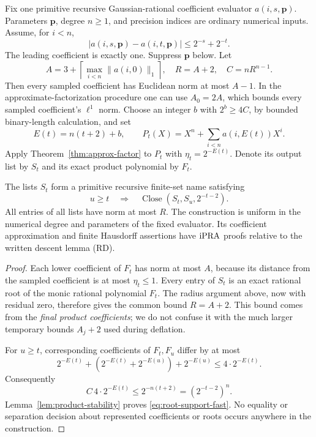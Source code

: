 Fix one primitive recursive Gaussian-rational coefficient evaluator
\(a(i,s,\mathbf p)\). Parameters \(\mathbf p\), degree \(n\ge1\), and
precision indices are ordinary numerical inputs. Assume, for \(i<n\),
\[
 |a(i,s,\mathbf p)-a(i,t,\mathbf p)|\le2^{-s}+2^{-t}.
 \tag{CN}\label{eq:coefficient-name-root}
\]
The leading coefficient is exactly one. Suppress \(\mathbf p\) below.
Let
\[
 A=3+\left\lceil\max_{i<n}\|a(i,0)\|_1\right\rceil,
 \quad R=A+2,\quad C=nR^{n-1}.
\]
Then every sampled coefficient has Euclidean norm at most \(A-1\).
In the approximate-factorization procedure one can use \(A_0=2A\),
which bounds every sampled coefficient's \(\ell^1\) norm.
Choose an integer \(b\) with \(2^b\ge4C\), by bounded binary-length
calculation, and set
\[
 E(t)=n(t+2)+b,\qquad
 P_t(X)=X^n+\sum_{i<n}a(i,E(t))X^i.
\]
Apply Theorem~\ref{thm:approx-factor} to \(P_t\) with
\(\eta_t=2^{-E(t)}\). Denote its output list by \(S_t\) and its exact
product polynomial by \(F_t\).

\begin{theorem}
\label{thm:root-support}
The lists \(S_t\) form a primitive recursive finite-set name satisfying
\[
 u\ge t\quad\Longrightarrow\quad
 \operatorname{Close}(S_t,S_u,2^{-t-2}).
 \tag{RS}\label{eq:root-support-fast}
\]
All entries of all lists have norm at most \(R\). The construction is
uniform in the numerical degree and parameters of the fixed evaluator.
Its coefficient approximation and finite Hausdorff assertions have
\(\mathrm{iPRA}\) proofs relative to the written descent lemma (RD).
\end{theorem}

\begin{proof}
Each lower coefficient of \(F_t\) has norm at most \(A\), because its
distance from the sampled coefficient is at most \(\eta_t\le1\).
Every entry of \(S_t\) is an exact rational root of the monic rational
polynomial \(F_t\). The radius argument above, now with residual zero,
therefore gives the common bound \(R=A+2\). This bound comes from the
\emph{final product coefficients}; we do not confuse it with the much
larger temporary bounds \(A_j+2\) used during deflation.

For \(u\ge t\), corresponding coefficients of \(F_t,F_u\) differ by
at most
\[
 2^{-E(t)}+(2^{-E(t)}+2^{-E(u)})+2^{-E(u)}
 \le4\cdot2^{-E(t)}.
\]
Consequently
\[
 C\,4\cdot2^{-E(t)}
 \le2^{-n(t+2)}=(2^{-t-2})^n.
\]
Lemma~\ref{lem:product-stability} proves \eqref{eq:root-support-fast}.
No equality or separation decision about represented coefficients or
roots occurs anywhere in the construction.
\end{proof}

